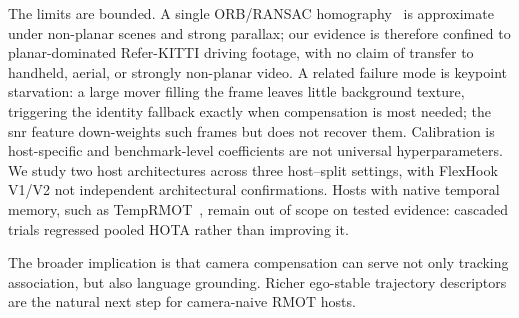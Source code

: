 \documentclass[sigconf,anonymous,nonacm]{acmart}
\begin{document}
The limits are bounded. A single ORB/RANSAC homography~\cite{botsort} is approximate under non-planar scenes and strong parallax; our evidence is therefore confined to planar-dominated Refer-KITTI driving footage, with no claim of transfer to handheld, aerial, or strongly non-planar video. A related failure mode is keypoint starvation: a large mover filling the frame leaves little background texture, triggering the identity fallback exactly when compensation is most needed; the snr feature down-weights such frames but does not recover them. Calibration is host-specific and benchmark-level coefficients are not universal hyperparameters. We study two host architectures across three host--split settings, with FlexHook V1/V2 not independent architectural confirmations. Hosts with native temporal memory, such as TempRMOT~\cite{temprmot}, remain out of scope on tested evidence: cascaded trials regressed pooled HOTA rather than improving it.

The broader implication is that camera compensation can serve not only tracking association, but also language grounding. Richer ego-stable trajectory descriptors are the natural next step for camera-naive RMOT hosts.



\end{document}
